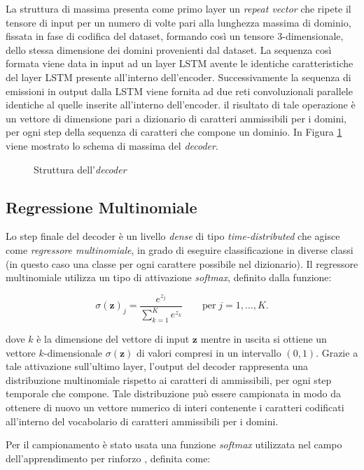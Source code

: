 La struttura di massima presenta come primo layer un \textit{repeat vector} che ripete il tensore di input per un numero di volte pari alla lunghezza massima di dominio, fissata in fase di codifica del dataset, formando così un tensore 3-dimensionale, dello stessa dimensione dei domini provenienti dal dataset. La sequenza così formata viene data in input ad un layer LSTM avente le identiche caratteristiche del layer LSTM presente all'interno dell'encoder. Successivamente la sequenza di emissioni in output dalla LSTM viene fornita ad due reti convoluzionali parallele identiche al quelle inserite all'interno dell'encoder. il risultato di tale operazione è un vettore di dimensione pari a dizionario di caratteri ammissibili per i domini, per ogni step della sequenza di caratteri che compone un dominio. In Figura \ref{fig:decoder} viene mostrato lo schema di massima del \textit{decoder}.

\begin{figure}[!htb]
    \centering
	
	\caption{Struttura dell'\textit{decoder}}
\label{fig:decoder}
\end{figure}

\subsection{Regressione Multinomiale}
Lo step finale del decoder è un livello \textit{dense} di tipo \textit{time-distributed} che agisce come \textit{regressore multinomiale}, in grado di eseguire classificazione in diverse classi (in questo caso una classe per ogni carattere possibile nel dizionario). Il regressore multinomiale utilizza un tipo di attivazione \textit{softmax}, definito dalla funzione:

\[\sigma(\mathbf{z})_j = \frac{e^{z_j}}{\sum_{k=1}^K e^{z_k}}\qquad  \text{per}\; j=1,\ldots,K. \] 

dove $k$ è la dimensione del vettore di input $\mathbf{z}$ mentre in uscita si ottiene un vettore $k$-dimensionale $\sigma(\mathbf{z})$ di valori compresi in un intervallo $\left(0,1\right)$. Grazie a tale attivazione sull'ultimo layer, l'output del decoder rappresenta una distribuzione multinomiale rispetto ai caratteri di ammissibili, per ogni step temporale che compone. 
Tale distribuzione può essere campionata in modo da ottenere di nuovo un vettore numerico di interi contenente i caratteri codificati all'interno del vocabolario di caratteri ammissibili per i domini. 

Per il campionamento è stato usata una funzione \textit{softmax} utilizzata nel campo dell'apprendimento per rinforzo \cite{reinflearning}, definita come: 

